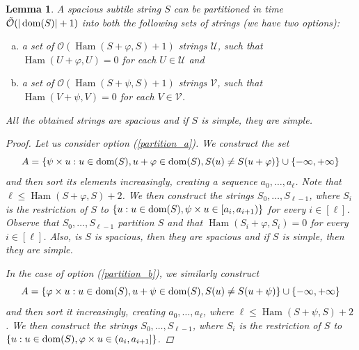 \documentclass[11pt, letterpaper]{article}
\theoremstyle{plain}
\newtheorem{lemma}{Lemma}
\theoremstyle{definition}
\theoremstyle{remark}
\renewcommand{\O}{\mathcal{O}}
\newcommand{\tO}{\tilde{\mathcal{O}}}
\newcommand{\U}{\mathcal{U}}
\newcommand{\V}{\mathcal{V}}
\renewcommand{\phi}{\varphi}
\newcommand{\set}[1]{\left\lbrace #1 \right\rbrace}
\DeclareMathOperator*{\Ham}{Ham}
\begin{document}
\begin{lemma}\label{cut_partitioning}
	A spacious subtile string $S$ can be partitioned in time $\tO(|\d{S}| + 1)$ into both the following sets of strings (we have two options):
	\begin{enumerate}[a)]
		\item a set of $\O(\Ham(S + \phi, S) + 1)$ strings $\U$, such that $\Ham(U + \phi, U) = 0$ for each $U \in \U$ and \label{partition_a}
		\item a set of $\O(\Ham(S + \psi, S) + 1)$ strings $\V$, such that $\Ham(V + \psi, V) = 0$ for each $V \in \V$. \label{partition_b}
	\end{enumerate}
	All the obtained strings are spacious and if $S$ is simple, they are simple.
	\begin{proof}
		Let us consider option (\ref{partition_a}). We construct the set
		\[ A = \set{\s{u} : u \in \d{S}, u + \phi \in \d{S}, S(u) \neq S(u + \phi)} \cup \set{-\infty, +\infty}\]
		and then sort its elements increasingly, creating a sequence $a_0, \dots, a_\ell$.
		Note that $\ell \le \Ham(S + \phi, S) + 2$.
		We then construct the strings $S_0, \dots, S_{\ell - 1}$, where $S_i$ is the restriction of $S$ to
		$\set{u : u \in \d{S}, \s{u} \in [a_i, a_{i + 1})}$ for every $i \in [\ell]$.
		Observe that $S_0, \dots, S_{\ell - 1}$ partition $S$ and that $\Ham(S_i + \phi, S_i) = 0$ for every $i \in [\ell]$.
		Also, is $S$ is spacious, then they are spacious and if $S$ is simple, then they are simple.
	
		In the case of option (\ref{partition_b}), we similarly construct
		\[ A = \set{\h{u} : u \in \d{S}, u + \psi \in \d{S}, S(u) \neq S(u + \psi)} \cup \set{-\infty, +\infty} \]
		and then sort it increasingly, creating $a_0, \dots, a_\ell$, where $\ell \le \Ham(S + \psi, S) + 2$.
		We then construct the strings $S_0, \dots, S_{\ell - 1}$, where $S_i$ is the restriction of $S$ to 
		$\set{u : u \in \d{S}, \h{u} \in (a_i, a_{i + 1}]}$.
	\end{proof}
\end{lemma}
\end{document}
